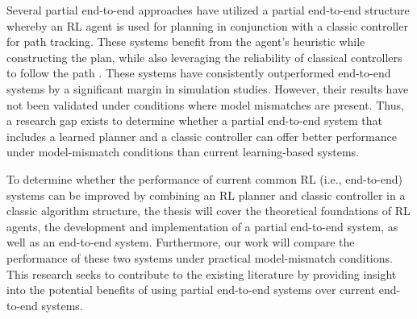 Several partial end-to-end approaches \cite{Capo2020, Weiss2020, Weiss2020a, Weiss2022} have utilized a partial end-to-end structure whereby an RL agent is used for planning in conjunction with a classic controller for path tracking. 
These systems benefit from the agent's heuristic while constructing the plan, while also leveraging the reliability of classical controllers to follow the path \cite{Betz2021}.
These systems have consistently outperformed end-to-end systems by a significant margin in simulation studies. 
However, their results have not been validated under conditions where model mismatches are present. 
Thus, a research gap exists to determine whether a partial end-to-end system that includes a learned planner and a classic controller can offer better performance under model-mismatch conditions than current learning-based systems.

To determine whether the performance of current common RL (i.e., end-to-end) systems can be improved by combining an RL planner and classic controller in a classic algorithm structure,
the thesis will cover the theoretical foundations of RL agents, the development and implementation of a partial end-to-end system, as well as an end-to-end system. 
Furthermore, our work will compare the performance of these two systems under practical model-mismatch conditions. 
This research seeks to contribute to the existing literature by providing insight into the potential benefits of using partial end-to-end systems over current end-to-end systems.






